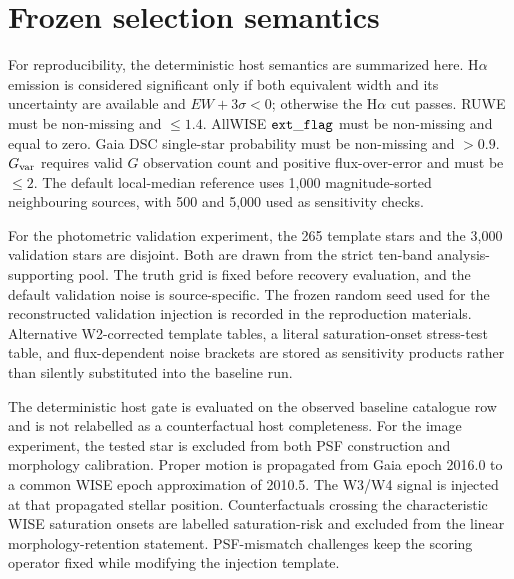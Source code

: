 \documentclass[fleqn,usenatbib]{mnras}
\begin{document}



\appendix

\section{Frozen selection semantics}
\label{app:semantics}

For reproducibility, the deterministic host semantics are summarized here. H$\alpha$ emission is considered significant only if both equivalent width and its uncertainty are available and $EW+3\sigma<0$; otherwise the H$\alpha$ cut passes. RUWE must be non-missing and $\le1.4$. AllWISE ${\tt ext\_flag}$ must be non-missing and equal to zero. Gaia DSC single-star probability must be non-missing and $>0.9$. $G_{\rm var}$ requires valid $G$ observation count and positive flux-over-error and must be $\le2$. The default local-median reference uses 1,000 magnitude-sorted neighbouring sources, with 500 and 5,000 used as sensitivity checks.

For the photometric validation experiment, the 265 template stars and the 3,000 validation stars are disjoint. Both are drawn from the strict ten-band analysis-supporting pool. The truth grid is fixed before recovery evaluation, and the default validation noise is source-specific. The frozen random seed used for the reconstructed validation injection is recorded in the reproduction materials. Alternative W2-corrected template tables, a literal saturation-onset stress-test table, and flux-dependent noise brackets are stored as sensitivity products rather than silently substituted into the baseline run.

The deterministic host gate is evaluated on the observed baseline catalogue row and is not relabelled as a counterfactual host completeness. For the image experiment, the tested star is excluded from both PSF construction and morphology calibration. Proper motion is propagated from Gaia epoch 2016.0 to a common WISE epoch approximation of 2010.5. The W3/W4 signal is injected at that propagated stellar position. Counterfactuals crossing the characteristic WISE saturation onsets are labelled saturation-risk and excluded from the linear morphology-retention statement. PSF-mismatch challenges keep the scoring operator fixed while modifying the injection template.

\label{lastpage}
\end{document}
